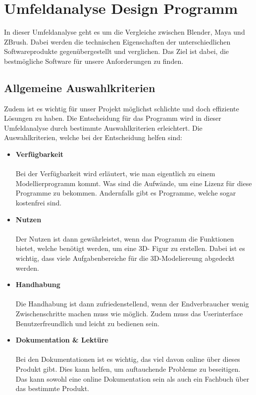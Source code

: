 
\section{Umfeldanalyse Design Programm}
In dieser Umfeldanalyse geht es um die Vergleiche zwischen Blender, Maya und ZBrush. Dabei werden die technischen Eigenschaften der unterschiedlichen Softwareprodukte gegenübergestellt und verglichen. Das Ziel ist dabei, die bestmögliche Software für unsere Anforderungen zu finden.

\subsection{Allgemeine Auswahlkriterien}
Zudem ist es wichtig für unser Projekt möglichst schlichte und doch effiziente Lösungen zu haben. Die Entscheidung für das Programm wird in dieser Umfeldanalyse durch bestimmte Auswahlkriterien erleichtert. Die Auswahlkriterien, welche bei der Entscheidung helfen sind: 

\begin{itemize}
    \item \textbf{Verfügbarkeit} \\\\ Bei der Verfügbarkeit wird erläutert, wie man eigentlich zu einem Modellierprogramm kommt. Was sind die Aufwände, um eine Lizenz für diese Programme zu bekommen. Andernfalls gibt es Programme, welche sogar kostenfrei sind.
    \item \textbf{Nutzen} \\\\Der Nutzen ist dann gewährleistet, wenn das Programm die Funktionen bietet, welche benötigt werden, um eine 3D- Figur zu erstellen. Dabei ist es wichtig, dass viele Aufgabenbereiche für die 3D-Modeliereung abgedeckt werden.
    \item \textbf{Handhabung} \\\\Die Handhabung ist dann zufriedenstellend, wenn der Endverbraucher wenig Zwischenschritte machen muss wie möglich. Zudem muss das Userinterface Benutzerfreundlich und leicht zu bedienen sein.
    \item \textbf{Dokumentation \& Lektüre} \\\\ Bei den Dokumentationen ist es wichtig, das viel davon online über dieses Produkt gibt. Dies kann helfen, um auftauchende Probleme zu beseitigen. Das kann sowohl eine online Dokumentation sein als auch ein Fachbuch über das bestimmte Produkt.
\end{itemize}




